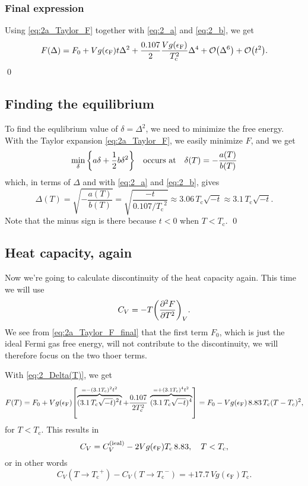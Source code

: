 \documentclass[11pt,letter, swedish, english
]{article}
\newcommand{\Tc}{\ensuremath{T_{\text{c}}}}
\newcommand{\eF}{\ensuremath{\epsilon_{\text{F}}}}
\begin{document}
\subsubsection{Final expression}
Using \eqref{eq:2a_Taylor_F} together with \eqref{eq:2_a} and
\eqref{eq:2_b}, we get
\begin{equation}\label{eq:2a_Taylor_F_final}
F(\Delta)=F_0+Vg(\eF)t\Delta^2 
+ \frac{0.107}{2}\frac{Vg(\eF)}{\Tc^2}\Delta^4 + \order{\Delta^6}+\order{t^2}.
\end{equation}
\qed


\subsection{Finding the equilibrium}
To find the equlibrium value of $\delta=\Delta^2$, we need to minimize
the free energy. With the Taylor expansion \eqref{eq:2a_Taylor_F}, we
easily minimize $F$, and we get
\begin{equation}
\min_{\delta}\qty{a\delta+\frac{1}{2}b\delta^2}\quad\text{occurs at}\quad
\delta(T)=-\frac{a(T)}{b(T)}
\end{equation}
which, in terms of $\Delta$ and with \eqref{eq:2_a} and
\eqref{eq:2_b}, gives
\begin{equation}\label{eq:2_Delta(T)}
\Delta(T)=\sqrt{-\frac{a(T)}{b(T)}}
=\sqrt{\frac{-t}{0.107/\Tc^2}}
\approx 3.06\,\Tc\sqrt{-t}\approx3.1\,\Tc\sqrt{-t}.
\end{equation}
Note that the minus sign is there because $t<0$ when $T<\Tc$.
\qed

\subsection{Heat capacity, again}
Now we're going to calculate discontinuity of the heat capacity
again. This time we will use
\begin{equation}
C_V=-T\qty(\pdv[2]{F}{T})_V.
\end{equation}
We see from \eqref{eq:2a_Taylor_F_final} that the first term $F_0$,
which is just the ideal Fermi gas free energy, will not contribute to
the discontinuity, we will therefore focus on the two thoer terms. 

With \eqref{eq:2_Delta(T)}, we get
\begin{equation}
F(T)=F_0+Vg(\eF)\qty[
\overbrace{(3.1\,\Tc\sqrt{-t})^2 t}^{=-(3.1\Tc)^2t^2} +
\frac{0.107}{2\Tc^2}\,
\overbrace{(3.1\,\Tc\sqrt{-t})^4}^{=+(3.1\Tc)^4t^2}
]
=F_0-Vg(\eF)\,8.83\,\Tc(T-T_c)^2,
\end{equation}
for $T<\Tc$.
This results in
\begin{equation}
C_V=C_V^{\text{(ieal)}} - 2Vg(\eF)\Tc\,8.83\qcomma
T<\Tc,
\end{equation}
or in other words
\begin{equation}
C_V(T\to\Tc^+)-C_V(T\to\Tc^-)=+17.7\,Vg(\eF)\Tc.
\end{equation}
\end{document}

